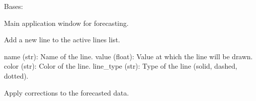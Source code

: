 \documentclass[letterpaper,10pt,english]{sphinxmanual}
\begin{document}
\begin{fulllineitems}
\label{\detokenize{Mainwindow:Mainwindow.MainWindow}}
\pysigstartsignatures
{}
\pysigstopsignatures
\sphinxAtStartPar
Bases: 

\sphinxAtStartPar
Main application window for forecasting.

\begin{fulllineitems}
\label{\detokenize{Mainwindow:Mainwindow.MainWindow.add_line}}
\pysigstartsignatures
{}
\pysigstopsignatures
\sphinxAtStartPar
Add a new line to the active lines list.
\begin{description}
\sphinxAtStartPar
name (str): Name of the line.
value (float): Value at which the line will be drawn.
color (str): Color of the line.
line\_type (str): Type of the line (solid, dashed, dotted).

\end{description}

\end{fulllineitems}


\begin{fulllineitems}
\label{\detokenize{Mainwindow:Mainwindow.MainWindow.apply_forecast_corrections}}
\pysigstartsignatures
{}
\pysigstopsignatures
\sphinxAtStartPar
Apply corrections to the forecasted data.

\end{fulllineitems}



\end{fulllineitems}
\end{document}
